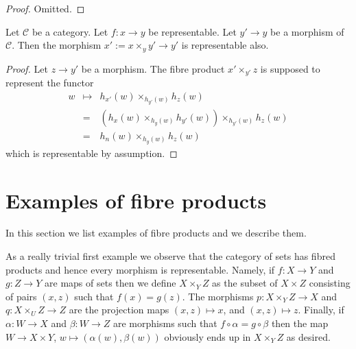 \begin{proof}
Omitted.
\end{proof}

\begin{lemma}
\label{lemma-base-change-representable}
Let $\mathcal{C}$ be a category.
Let $f : x \to y$ be representable.
Let $y' \to y$ be a morphism of $\mathcal{C}$.
Then the morphism $x' := x \times_y y' \to y'$ is representable also.
\end{lemma}

\begin{proof}
Let $z \to y'$ be a morphism. The fibre product
$x' \times_{y'} z$ is supposed to represent the
functor
\begin{eqnarray*}
w & \mapsto & h_{x'}(w)\times_{h_{y'}(w)} h_z(w) \\
& = & (h_x(w) \times_{h_y(w)} h_{y'}(w)) \times_{h_{y'}(w)} h_z(w) \\
& = & h_n(w) \times_{h_y(w)} h_z(w)
\end{eqnarray*}
which is representable by assumption.
\end{proof}

\section{Examples of fibre products}
\label{section-example-fibre-products}

\noindent
In this section we list examples of fibre products and
we describe them.

\medskip\noindent 
As a really trivial first example we observe 
that the category of sets has fibred products and hence every
morphism is representable. Namely, if $f : X \to Y$
and $g : Z \to Y$ are maps of sets then we define
$X\times_Y Z$ as the subset of $X\times Z$ consisting
of pairs $(x,z)$ such that $f(x) = g(z)$. The morphisms
$p : X\times_Y Z \to X$ and $q : X\times_U Z \to Z$ are
the projection maps $(x,z) \mapsto x$, and $(x,z) \mapsto z$.
Finally, if $\alpha : W \to X$ and $\beta : W \to Z$ 
are morphisms such that $f \circ \alpha = g \circ \beta$
then the map $W \to X\times Y$, $w\mapsto (\alpha(w), \beta(w))$
obviously ends up in $X\times_YZ$ as desired.

